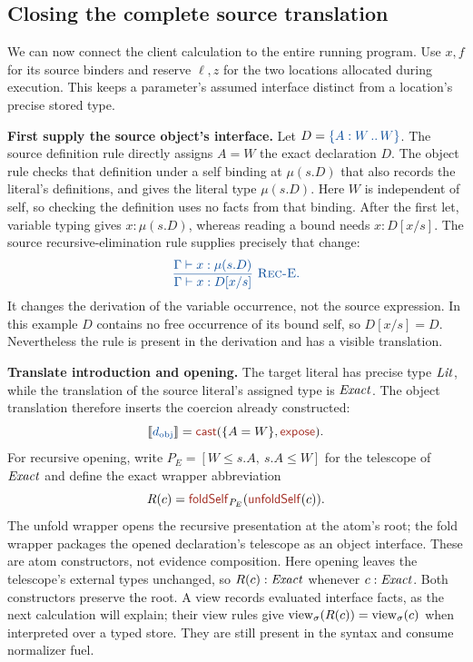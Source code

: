 \subsection{Closing the complete source translation}\label{sec:closed-program}
We can now connect the client calculation to the entire running program.
Use $x,f$ for its source binders and reserve $\ell,z$ for the two
locations allocated during execution. This keeps a parameter's assumed
interface distinct from a location's precise stored type.

\textbf{First supply the source object's interface.}
Let $D=\iface{W}{W}$. The source definition rule directly assigns
$A=W$ the exact declaration $D$. The object rule checks that definition
under a self binding at $\mu(s.D)$ that also records the literal's
definitions, and gives the literal type $\mu(s.D)$.
Here $W$ is independent of self, so checking the definition uses no
facts from that binding. After the first let, variable typing gives
$x:\mu(s.D)$, whereas reading a bound needs $x:D[x/s]$.
The source recursive-elimination rule supplies precisely that change:
\[
 \src{\frac{\Gamma\vdash x:\mu(s.D)}
                 {\Gamma\vdash x:D[x/s]}\ \textsc{Rec-E}.}
\]
It changes the derivation of the variable occurrence, not the source
expression. In this example $D$ contains no free occurrence of its
bound self, so $D[x/s]=D$. Nevertheless the rule is present in the
derivation and has a visible translation.

\textbf{Translate introduction and opening.}
The target literal has precise type $\mathit{Lit}$, while the translation
of the source literal's assigned type is $\mathit{Exact}$. The object
translation therefore inserts the coercion already constructed:
\[
 \tr{d_{\mathrm{obj}}}
       =\cast{\{A=W\}}{\ev{expose}}.
\]
For recursive opening, write
$P_E=[W\le s.A,\ s.A\le W]$ for the telescope of $\mathit{Exact}$ and define
the exact wrapper abbreviation
\[
 R(c)=\ev{foldSelf}_{P_E}(\ev{unfoldSelf}(c)).
\]
The unfold wrapper opens the recursive presentation at the atom's root;
the fold wrapper packages the opened declaration's telescope as an
object interface. These are atom constructors, not evidence composition.
Here opening leaves the telescope's external types unchanged, so
$R(c):\mathit{Exact}$ whenever $c:\mathit{Exact}$.
Both constructors preserve the root. A view records evaluated interface
facts, as the next calculation will explain; their view rules give
$\operatorname{view}_{\sigma}(R(c))=\operatorname{view}_{\sigma}(c)$ when interpreted over a typed store.
They are still present in the syntax and consume normalizer fuel.

